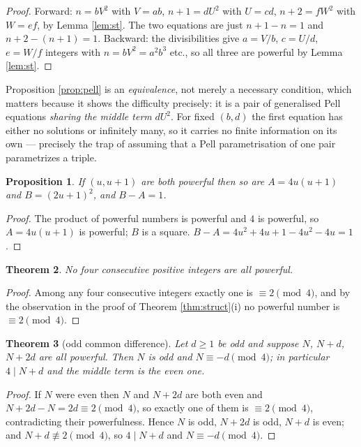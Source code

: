 \documentclass[11pt]{article}
\newtheorem{theorem}{Theorem}[section]
\newtheorem{proposition}[theorem]{Proposition}
\theoremstyle{definition}
\begin{document}
\begin{proof}
Forward: $n=bV^2$ with $V=ab$, $n+1=dU^2$ with $U=cd$, $n+2=fW^2$ with $W=ef$, by
Lemma \ref{lem:st}. The two equations are just $n+1-n=1$ and $n+2-(n+1)=1$.
Backward: the divisibilities give $a=V/b$, $c=U/d$, $e=W/f$ integers with
$n=bV^2=a^2b^3$ etc., so all three are powerful by Lemma \ref{lem:st}.
\end{proof}

\begin{remark}
Proposition \ref{prop:pell} is an \emph{equivalence}, not merely a necessary
condition, which matters because it shows the difficulty precisely: it is a pair of
generalised Pell equations \emph{sharing the middle term} $dU^2$. For fixed
$(b,d)$ the first equation has either no solutions or infinitely many, so it carries
no finite information on its own --- precisely the trap of assuming that a Pell
parametrisation of one pair parametrizes a triple.
\end{remark}

\begin{proposition}\label{prop:closure}
If $(u,u+1)$ are both powerful then so are $A=4u(u+1)$ and $B=(2u+1)^2$, and
$B-A=1$.
\end{proposition}

\begin{proof}
The product of powerful numbers is powerful and $4$ is powerful, so
$A=4u(u+1)$ is powerful; $B$ is a square. $B-A=4u^2+4u+1-4u^2-4u=1$.
\end{proof}

\begin{theorem}\label{thm:quad}
No four consecutive positive integers are all powerful.
\end{theorem}

\begin{proof}
Among any four consecutive integers exactly one is $\equiv2\pmod4$, and by the
observation in the proof of Theorem \ref{thm:struct}(i) no powerful number is
$\equiv2\pmod4$.
\end{proof}

\begin{theorem}[odd common difference]\label{thm:odd}
Let $d\ge1$ be odd and suppose $N$, $N+d$, $N+2d$ are all powerful. Then $N$ is odd
and $N\equiv-d\pmod4$; in particular $4\mid N+d$ and the middle term is the even one.
\end{theorem}

\begin{proof}
If $N$ were even then $N$ and $N+2d$ are both even and $N+2d-N=2d\equiv2\pmod4$,
so exactly one of them is $\equiv2\pmod4$, contradicting their powerfulness. Hence
$N$ is odd, $N+2d$ is odd, $N+d$ is even; and $N+d\not\equiv2\pmod4$, so
$4\mid N+d$ and $N\equiv-d\pmod4$.
\end{proof}
\end{document}
